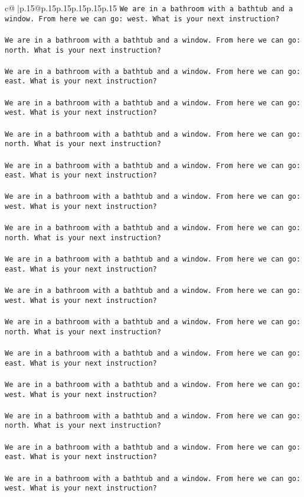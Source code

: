 \documentclass{article}
\begin{document}
{\begin{supertabular}{c@{$\;$}|p{.15\linewidth}@{}p{.15\linewidth}p{.15\linewidth}p{.15\linewidth}p{.15\linewidth}p{.15\linewidth}}
{{{\tt We are in a bathroom with a bathtub and a window. From here we can go: west. What is your next instruction?\\ \tt \\ \tt We are in a bathroom with a bathtub and a window. From here we can go: north. What is your next instruction?\\ \tt \\ \tt We are in a bathroom with a bathtub and a window. From here we can go: east. What is your next instruction?\\ \tt \\ \tt We are in a bathroom with a bathtub and a window. From here we can go: west. What is your next instruction?\\ \tt \\ \tt We are in a bathroom with a bathtub and a window. From here we can go: north. What is your next instruction?\\ \tt \\ \tt We are in a bathroom with a bathtub and a window. From here we can go: east. What is your next instruction?\\ \tt \\ \tt We are in a bathroom with a bathtub and a window. From here we can go: west. What is your next instruction?\\ \tt \\ \tt We are in a bathroom with a bathtub and a window. From here we can go: north. What is your next instruction?\\ \tt \\ \tt We are in a bathroom with a bathtub and a window. From here we can go: east. What is your next instruction?\\ \tt \\ \tt We are in a bathroom with a bathtub and a window. From here we can go: west. What is your next instruction?\\ \tt \\ \tt We are in a bathroom with a bathtub and a window. From here we can go: north. What is your next instruction?\\ \tt \\ \tt We are in a bathroom with a bathtub and a window. From here we can go: east. What is your next instruction?\\ \tt \\ \tt We are in a bathroom with a bathtub and a window. From here we can go: west. What is your next instruction?\\ \tt \\ \tt We are in a bathroom with a bathtub and a window. From here we can go: north. What is your next instruction?\\ \tt \\ \tt We are in a bathroom with a bathtub and a window. From here we can go: east. What is your next instruction?\\ \tt \\ \tt We are in a bathroom with a bathtub and a window. From here we can go: west. What is your next instruction?\\ }}}
\end{supertabular}}
\end{document}
